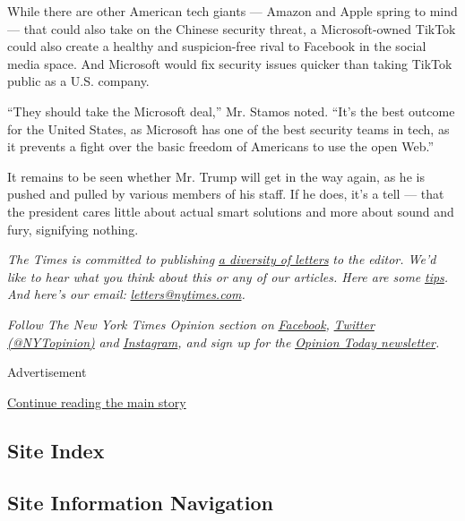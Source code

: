 While there are other American tech giants --- Amazon and Apple spring
to mind --- that could also take on the Chinese security threat, a
Microsoft-owned TikTok could also create a healthy and suspicion-free
rival to Facebook in the social media space. And Microsoft would fix
security issues quicker than taking TikTok public as a U.S. company.

``They should take the Microsoft deal,'' Mr. Stamos noted. ``It's the
best outcome for the United States, as Microsoft has one of the best
security teams in tech, as it prevents a fight over the basic freedom of
Americans to use the open Web.''

It remains to be seen whether Mr. Trump will get in the way again, as he
is pushed and pulled by various members of his staff. If he does, it's a
tell --- that the president cares little about actual smart solutions
and more about sound and fury, signifying nothing.

\emph{The Times is committed to publishing}
\href{https://www.nytimes.com/2019/01/31/opinion/letters/letters-to-editor-new-york-times-women.html}{\emph{a
diversity of letters}} \emph{to the editor. We'd like to hear what you
think about this or any of our articles. Here are some}
\href{https://help.nytimes.com/hc/en-us/articles/115014925288-How-to-submit-a-letter-to-the-editor}{\emph{tips}}\emph{.
And here's our email:}
\href{mailto:letters@nytimes.com}{\emph{letters@nytimes.com}}\emph{.}

\emph{Follow The New York Times Opinion section on}
\href{https://www.facebook.com/nytopinion}{\emph{Facebook}}\emph{,}
\href{http://twitter.com/NYTOpinion}{\emph{Twitter (@NYTopinion)}}
\emph{and}
\href{https://www.instagram.com/nytopinion/}{\emph{Instagram}}\emph{,
and sign up for the}
\href{http://www.nytimes.com/newsletters/opiniontoday/}{\emph{Opinion
Today newsletter}}\emph{.}

Advertisement

\protect\hyperlink{after-bottom}{Continue reading the main story}

\hypertarget{site-index}{%
\subsection{Site Index}\label{site-index}}

\hypertarget{site-information-navigation}{%
\subsection{Site Information
Navigation}\label{site-information-navigation}}

